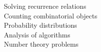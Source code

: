 \documentclass[preview]{standalone}
\begin{document}
Solving recurrence relations\\Counting combinatorial objects\\Probability distributions\\Analysis of algorithms\\Number theory problems\\
\end{document}
